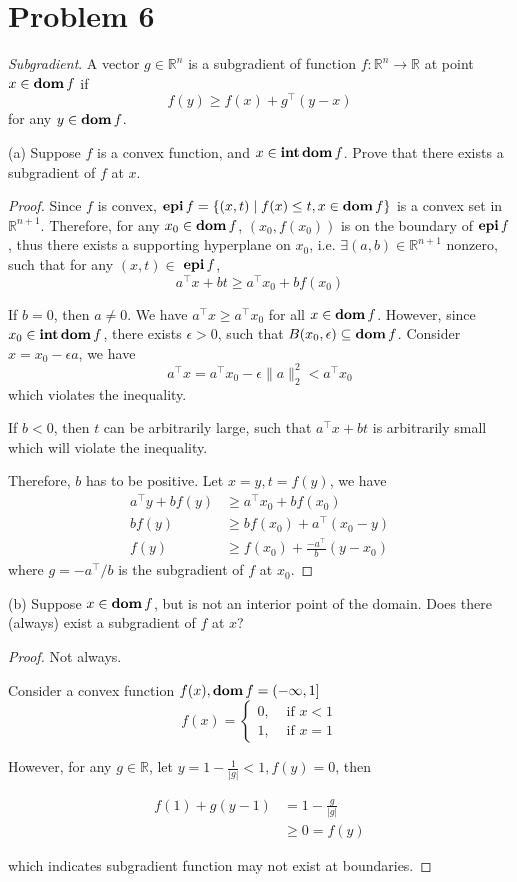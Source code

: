 \documentclass[11pt]{article}
\newcommand{\RR}{\mathbb{R}}
\newcommand{\T}{^\top}
\begin{document}
\clearpage
\section*{Problem 6}
\textit{Subgradient}. A vector $g\in \RR^n$ is a subgradient of function $f:\RR^n \rightarrow \RR$ at point $x\in\mathop{\textbf{dom}} f$ if
\[
f(y) \geq f(x) + g\T (y-x)
\] 
for any $y\in\mathop{\textbf{dom}} f$.

(a) Suppose $f$ is a convex function, and $x\in\mathop{\textbf{int}}\mathop{\textbf{dom}} f$. Prove that there exists a subgradient of $f$ at $x$.

\begin{proof}
  Since $f$ is convex, $\mathop{\textbf{epi}} f=\{(x, t) \mid f(x) \leq t, x \in \mathop{\textbf{dom}} f\}$ is a convex set in $\RR^{n+1}$. Therefore, for any $x_0 \in \mathop{\textbf{dom}} f$, $\left(x_0, f(x_0)\right)$ is on the boundary of $\mathop{\textbf{epi}} f$, thus there exists a supporting hyperplane on $x_0$, i.e. $\exists (a, b) \in \RR^{n+1}$ nonzero, such that for any $(x, t) \in$ $\mathop{\textbf{epi}} f$,
  \[
    a\T x+b t \geq a\T x_0+b f\left(x_0\right)
  \]
  
  If $b=0$, then $a\neq0$. We have $a\T x \geq a\T x_0$ for all $x\in\mathop{\textbf{dom}} f$. However, since $x_0 \in\mathop{\textbf{int}}\mathop{\textbf{dom}} f$, there exists $\epsilon > 0$, such that $B(x_0, \epsilon) \subseteq \mathop{\textbf{dom}} f$. Consider $x=x_0 - \epsilon a$, we have
  \[
    a\T x = a\T x_0 - \epsilon\|a\|_2^2 < a\T x_0
  \]
  which violates the inequality.

  If $b<0$, then $t$ can be arbitrarily large, such that $a\T x+bt$ is arbitrarily small which will violate the inequality.

  Therefore, $b$ has to be positive. Let $x=y, t = f(y)$, we have
  \begin{align*}
    a\T y + b f(y) &\geq  a\T x_0 + bf(x_0)\\
    b f(y) &\geq b f(x_0) + a\T (x_0 - y)\\
    f(y) &\geq f(x_0) + \frac{-a\T}{b} (y - x_0)
  \end{align*}
  where $g = -a\T/b$ is the subgradient of $f$ at $x_0$.
\end{proof}


(b) Suppose $x\in\mathop{\textbf{dom}} f$, but is not an interior point of the domain. Does there (always) exist a subgradient of $f$ at $x$?
\begin{proof}
  Not always.

  Consider a convex function $f(x), \mathop{\textbf{dom}} f = (-\infty, 1]$
  $$
  f(x)= 
  \begin{cases}
    0, & \text { if } x <1 \\ 
    1, & \text { if } x=1
  \end{cases}
  $$

  However, for any $g \in \RR$, let $y=1-\frac{1}{|g|} < 1, f(y) = 0$, then

  $$
  \begin{aligned}
  f(1) + g(y-1) &= 1-\frac{g}{|g|} \\
  & \geq 0  = f(y)
  \end{aligned}
  $$

  which indicates subgradient function may not exist at boundaries.
  \end{proof}
\end{document}
